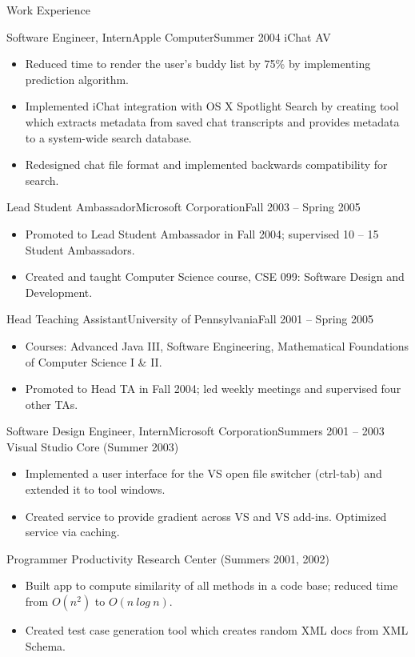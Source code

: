 \begin{cvsection}{Work Experience}
	\begin{cvsubsection}{Software Engineer, Intern}{Apple Computer}{Summer 2004}
		iChat AV			
		\begin{itemize}
			\item Reduced time to render the user’s buddy list by 75\% by implementing prediction algorithm.
			\item Implemented iChat integration with OS X Spotlight Search by creating tool which extracts metadata from saved chat transcripts and provides metadata to a system-wide search database.
			\item Redesigned chat file format and implemented backwards compatibility for search.
		\end{itemize}
	\end{cvsubsection}
	
	\begin{cvsubsection}{Lead Student Ambassador}{Microsoft Corporation}{Fall 2003 -- Spring 2005}	
		\begin{itemize}
			\item Promoted to Lead Student Ambassador in Fall 2004; supervised 10 -- 15 Student Ambassadors.
			\item Created and taught Computer Science course, CSE 099: Software Design and Development.
		\end{itemize}
	\end{cvsubsection}
	
	\begin{cvsubsection}{Head Teaching Assistant}{University of Pennsylvania}{Fall 2001 -- Spring 2005}		
		\begin{itemize}
			\item Courses: Advanced Java III, Software Engineering, Mathematical Foundations of Computer Science I \& II.
			\item Promoted to Head TA in Fall 2004; led weekly meetings and supervised four other TAs.
		\end{itemize}
	\end{cvsubsection}
	
	\begin{cvsubsection}{Software Design Engineer, Intern}{Microsoft Corporation}{Summers 2001 -- 2003}
		Visual Studio Core (Summer 2003)		
		\begin{itemize}
			\item Implemented a user interface for the VS open file switcher (ctrl-tab) and extended it to tool windows.
			\item Created service to provide gradient across VS and VS add-ins. Optimized service via caching.
		\end{itemize}
		Programmer Productivity Research Center (Summers 2001, 2002)
		\begin{itemize}
			\item Built app to compute similarity of all methods in a code base; reduced time from $O(n^2)$ to $O(n\ log\ n)$. 
			\item Created test case generation tool which creates random XML docs from XML Schema.
		\end{itemize}
	\end{cvsubsection}
\end{cvsection}